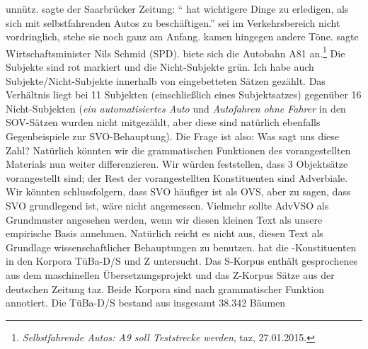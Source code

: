 unnütz.  sagte der Saarbrücker Zeitung: "` hat wichtigere Dinge zu erledigen, als sich mit selbstfahrenden Autos zu beschäftigen."'
 sei im Verkehrsbereich nicht vordringlich,  stehe sie noch ganz am
Anfang.  
kamen hingegen andere Töne.  sagte Wirtschaftsminister Nils Schmid (SPD).  biete sich die Autobahn A81 an.\footnote{\emph{Selbstfahrende Autos: A9 soll Teststrecke werden}, taz, 27.01.2015.}
\z
Die Subjekte sind rot markiert und die Nicht-Subjekte grün. Ich habe auch Subjekte/Nicht-Subjekte
innerhalb von eingebetteten Sätzen gezählt. Das Verhältnis liegt bei 11 Subjekten (einschließlich eines Subjektsatzes) gegenüber 16
Nicht-Subjekten (\emph{ein automatisiertes Auto} und \emph{Autofahren ohne Fahrer} in den SOV-Sätzen wurden nicht mitgezählt, aber diese sind
natürlich ebenfalls Gegenbeispiele zur SVO-Behauptung). Die Frage ist also: Was sagt uns
diese Zahl? Natürlich könnten wir die grammatischen Funktionen des
vorangestellten Materials nun weiter differenzieren. Wir würden feststellen, dass 3 Objektsätze vorangestellt sind; der Rest der vorangestellten
Konstituenten sind Adverbiale. Wir könnten schlussfolgern, dass SVO häufiger ist als OVS, aber zu sagen, dass SVO
grundlegend ist, wäre nicht angemessen. Vielmehr sollte AdvVSO als Grundmuster angesehen werden, wenn wir
diesen kleinen Text als unsere empirische Basis annehmen. Natürlich reicht es nicht aus, diesen Text als Grundlage
wissenschaftlicher Behauptungen zu benutzen.
\citet[Abschnitt~4]{HK2005a} hat die \vf-Konstituenten
in den Korpora TüBa-D/S und Z untersucht. Das S-Korpus enthält gesprochenes  aus dem maschinellen
Übersetzungsprojekt \verbmobil und das Z-Korpus Sätze aus der deutschen Zeitung taz. Beide
Korpora sind nach grammatischer Funktion annotiert. Die TüBa-D/S bestand aus insgesamt 38.342 Bäumen
